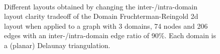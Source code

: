 {\begin{landscape}
\begin{figure}
{    }\\[5mm]
    \caption[Effect of different values of the inter-/intra-domain layout clarity tradeoff.]{Different layouts obtained by changing the inter-/intra-domain layout clarity tradeoff of the Domain Fruchterman-Reingold \gls{2d} layout when applied to a graph with 3 domains, 74 nodes and 206 edges with an inter-/intra-domain edge ratio of 90\%. Each domain is a (planar) Delaunay triangulation.}%
    \label{fig:ex5}
    \clearpage
  \end{figure}
  \end{landscape}
    \cleartoodd
}

